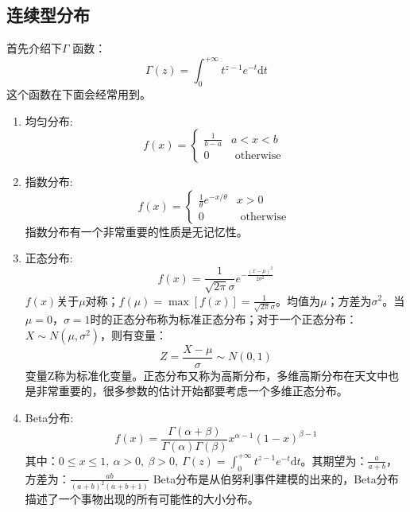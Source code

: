 \subsection{连续型分布}
首先介绍下$\Gamma$ 函数：
\begin{equation}
    \Gamma(z)=\int_{0}^{+\infty} t^{z-1} e^{-t} \mathrm{d} t
\end{equation}
这个函数在下面会经常用到。
\begin{enumerate}
\item 均匀分布: 
   \begin{equation}
        f(x)=\left\{\begin{array}{ll}\frac{1}{b-a} & a<x<b \\0 & \text { otherwise }\end{array}\right.
   \end{equation}
   
\item 指数分布: 
\begin{equation}
    f(x)=\left\{\begin{array}{ll}\frac{1}{\theta} e^{-x / \theta} & x>0 \\0 & \text { otherwise }\end{array}\right.
\end{equation}
指数分布有一个非常重要的性质是无记忆性。

\item 正态分布: 
\begin{equation}
    f(x)=\frac{1}{\sqrt{2 \pi} \sigma} e^{-\frac{(x-\mu)^{2}}{2 \sigma^{2}}}
\end{equation}
$f(x)$关于$\mu$对称；$f(\mu)=\max[f(x)]=\frac{1}{\sqrt{2\pi}\sigma}$。均值为$\mu$；方差为$\sigma ^2$。当$\mu = 0$，$\sigma=1$时的正态分布称为标准正态分布；对于一个正态分布：$X\sim N(\mu,\sigma^2)$，则有变量：
$$Z=\frac{X-\mu}{\sigma}\sim N(0,1)
$$
变量Z称为标准化变量。正态分布又称为高斯分布，多维高斯分布在天文中也是非常重要的，很多参数的估计开始都要考虑一个多维正态分布。

\item  Beta分布: 
   \begin{equation}
    f(x)=\frac{\Gamma(\alpha+\beta)}{\Gamma(\alpha) \Gamma(\beta)} x^{\alpha-1}(1-x)^{\beta-1}
   \end{equation}
其中：$0\leq x\leq 1, \ \alpha>0,\ \beta>0,\ \Gamma(z)=\int_{0}^{+\infty} t^{z-1} e^{-t} \mathrm{d} t$。其期望为：$\frac{a}{a+b}$，方差为：$\frac{ab}{(a+b)^2(a+b+1)}$
Beta分布是从伯努利事件建模的出来的，Beta分布描述了一个事物出现的所有可能性的大小分布。


\end{enumerate}
